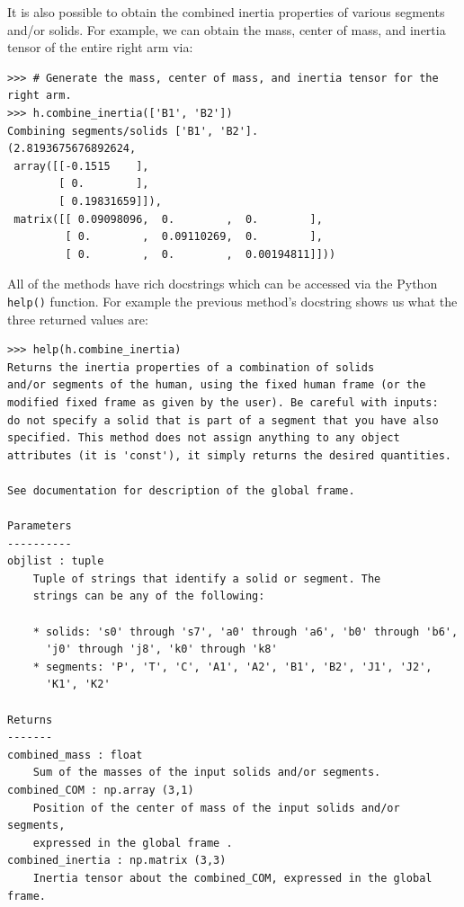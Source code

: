 \documentclass[10pt]{article}
\begin{document}
It is also possible to obtain the combined inertia properties of various
segments and/or solids. For example, we can obtain the mass, center of mass,
and inertia tensor of the entire right arm via:

\begin{verbatim}
>>> # Generate the mass, center of mass, and inertia tensor for the right arm.
>>> h.combine_inertia(['B1', 'B2'])
Combining segments/solids ['B1', 'B2'].
(2.8193675676892624,
 array([[-0.1515    ],
        [ 0.        ],
        [ 0.19831659]]),
 matrix([[ 0.09098096,  0.        ,  0.        ],
         [ 0.        ,  0.09110269,  0.        ],
         [ 0.        ,  0.        ,  0.00194811]]))
\end{verbatim}


All of the methods have rich docstrings which can be accessed via the Python
\verb+help()+ function. For example the previous method's docstring shows us
what the three returned values are:

\begin{verbatim}
>>> help(h.combine_inertia)
Returns the inertia properties of a combination of solids
and/or segments of the human, using the fixed human frame (or the
modified fixed frame as given by the user). Be careful with inputs:
do not specify a solid that is part of a segment that you have also
specified. This method does not assign anything to any object
attributes (it is 'const'), it simply returns the desired quantities.

See documentation for description of the global frame.

Parameters
----------
objlist : tuple
    Tuple of strings that identify a solid or segment. The
    strings can be any of the following:

    * solids: 's0' through 's7', 'a0' through 'a6', 'b0' through 'b6',
      'j0' through 'j8', 'k0' through 'k8'
    * segments: 'P', 'T', 'C', 'A1', 'A2', 'B1', 'B2', 'J1', 'J2',
      'K1', 'K2'

Returns
-------
combined_mass : float
    Sum of the masses of the input solids and/or segments.
combined_COM : np.array (3,1)
    Position of the center of mass of the input solids and/or segments,
    expressed in the global frame .
combined_inertia : np.matrix (3,3)
    Inertia tensor about the combined_COM, expressed in the global frame.
\end{verbatim}
\end{document}
